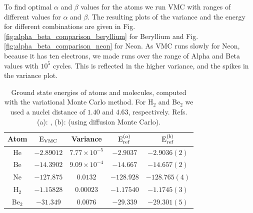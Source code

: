 		To find optimal $\alpha$ and $\beta$ values for the atoms we
                run VMC with ranges of different values for \(\alpha\)
                and \(\beta\). The resulting plots of the variance and  the
                energy for different combinations are given in
                Fig. \ref{fig:alpha_beta_comparison_beryllium} for
                Beryllium and
                Fig. \ref{fig:alpha_beta_comparison_neon} for Neon. As
                VMC runs slowly for Neon, because it has ten electrons,
                we made runs over the range of Alpha and
                Beta values with $10^{5}$ cycles. This is reflected in
                the higher variance, and the spikes in the variance
                plot.

		\begin{table}
			\center %
			\begin{tabular}{c|c|c|c|c}
				Atom  & $\mbox{E}_{\mbox{\scriptsize{VMC}}}$ & Variance & $\mbox{E}_{\mbox{\scriptsize{ref}}}^{(a)}$ & $\mbox{E}_{\mbox{\scriptsize{ref}}}^{(b)}$ \tabularnewline
				\hline 
				He & $-2.89012$ & $7.77\times10^{-5}$ & $-2.9037$ & $-2.9036(2)$\tabularnewline
				Be & $-14.3902$  & $9.09\times10^{-4}$ & $-14.667$ & $-14.657(2)$ \tabularnewline
				Ne  & $-127.875$ & $0.0132$ & $-128.928$ & $-128.765(4)$ \tabularnewline
				H$_2$ &   $-1.15828$	& $0.00023$  & $-1.17540$ & $-1.1745(3)$ \tabularnewline
				Be$_{2}$   & $ -31.349 $	& $ 0.0076 $  & $-29.339$ & $-29.301(5)$ \tabularnewline
			\end{tabular}%
			\protect\caption{Ground state energies of atoms and molecules, computed with the variational Monte Carlo method. For H$_2$ and Be$_2$ we used a nuclei distance of \( 1.40 \) and \( 4.63\), respectively.  Refs. (a): \cite{Koput_2011_PCCP} \cite{Binkley_1975}, (b): \cite{hogbergetDMC} (using diffusion Monte Carlo).}
			\label{tab:EnergyAlphaBetaReference} 
		\end{table}

